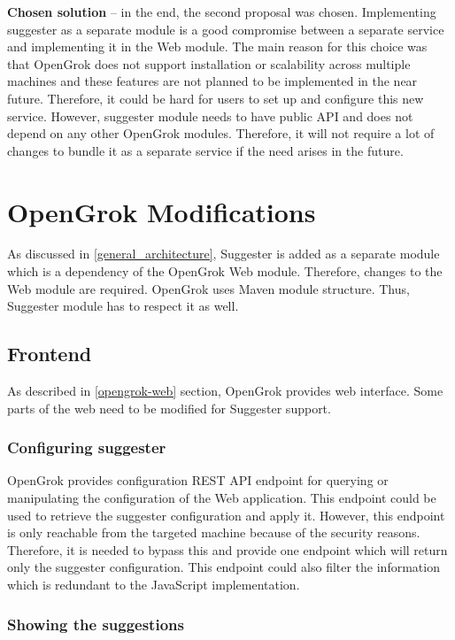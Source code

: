 \textbf{Chosen solution} – in the end, the second proposal was chosen. Implementing suggester as a separate module is a
good compromise between a separate service and implementing it in the Web module. The main reason for this choice was that
OpenGrok does not support installation or scalability across multiple machines and these features are not planned to be
implemented in the near future. Therefore, it could be hard for users to set up and configure this new service.
However, suggester module needs to have public API and does not depend on any other OpenGrok modules. Therefore, it
will not require a lot of changes to bundle it as a separate service if the need arises in the future.

\section{OpenGrok Modifications}
\label{opengrok_modifications}

As discussed in \ref{general_architecture}, Suggester is added as a separate module which is a dependency of the
OpenGrok Web module. Therefore, changes to the Web module are required. OpenGrok uses Maven module structure.
Thus, Suggester module has to respect it as well.

\subsection{Frontend}

As described in \ref{opengrok-web} section, OpenGrok provides web interface. Some parts of the web need to be modified
for Suggester support.

\subsubsection{Configuring suggester}
OpenGrok provides configuration REST API endpoint for querying or manipulating the configuration of the Web application.
This endpoint could be used to retrieve the suggester configuration and apply it.
However, this endpoint is only reachable from the targeted machine because of the security reasons.
Therefore, it is needed to bypass this and provide one endpoint which will return only the suggester configuration.
This endpoint could also filter the information which is redundant to the JavaScript implementation.

\subsubsection{Showing the suggestions}
\label{showing_suggestions}


